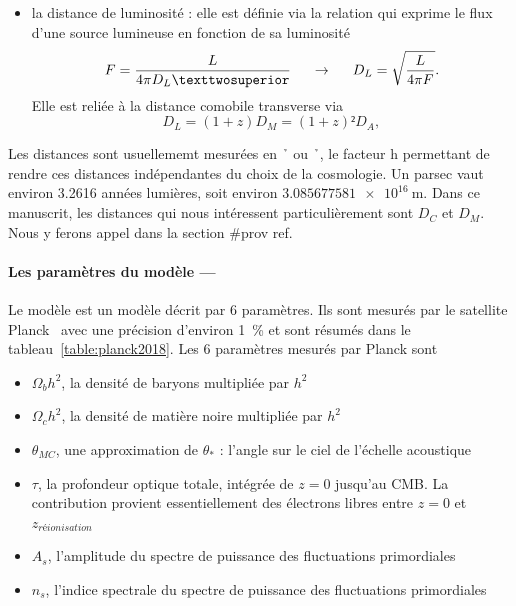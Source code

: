 \documentclass[11pt, twoside, a4paper, openright]{report}
\begin{document}
\begin{itemize}[label=$\bullet$]
\item la distance de luminosité : elle est définie via la relation qui exprime le flux d'une source lumineuse en fonction de sa luminosité
  \begin{equation}
    \label{eq:dist_lum}
    F = \frac{L}{4\pi D_L²} \hspace{0.5cm} \rightarrow \hspace{0.5cm} D_L = \sqrt{\frac{L}{4 \pi F}} .
  \end{equation}
  Elle est reliée à la distance comobile transverse via
  \begin{equation}
    D_L = (1+z) D_M = (1+z)² D_A ,
  \end{equation}
\end{itemize}
Les distances sont usuellememt mesurées en \si{\per\h\kpc} ou \si{\per\h\Mpc}, le facteur $\mathrm{h}$ permettant de rendre ces distances indépendantes du choix de la cosmologie. Un parsec vaut environ \num{3.2616} années lumières, soit environ $\SI{3,085 677 581 e16}{\meter}$.
Dans ce manuscrit, les distances qui nous intéressent particulièrement sont $D_C$ et $D_M$. Nous y ferons appel dans la section \#prov ref.

\paragraph{Les paramètres du modèle —} 
Le modèle \lcdm{} est un modèle décrit par 6 paramètres. Ils sont mesurés par le satellite Planck~\cite{CITE ref} avec une précision d'environ 1~\% et sont résumés dans le tableau~\ref{table:planck2018}. Les 6 paramètres mesurés par Planck sont
\begin{itemize}
\item $\Omega_bh^2$, la densité de baryons multipliée par $h^2$
\item $\Omega_ch^2$, la densité de matière noire multipliée par $h^2$
\item $\theta_{MC}$, une approximation de $\theta_*$ : l'angle sur le ciel de l'échelle acoustique
\item $\tau$, la profondeur optique totale, intégrée de $z=0$ jusqu'au CMB. La contribution provient essentiellement des électrons libres entre $z = 0$ et $z_{réionisation}$
\item $A_s$, l'amplitude du spectre de puissance des fluctuations primordiales 
\item $n_s$, l'indice spectrale du spectre de puissance des fluctuations primordiales
\end{itemize}
\end{document}

